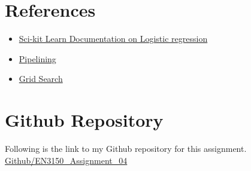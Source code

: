 \documentclass[11pt,a4paper]{article}
\begin{document}
\section{References}

\begin{itemize}
    \item \href{https://scikit-learn.org/stable/modules/generated/sklearn.linear_model.LinearRegression.html}{Sci-kit Learn Documentation on Logistic regression}
    \item \href{https://scikit-learn.org/stable/auto_examples/compose/plot_digits_pipe.html}{Pipelining}
    \item \href{https://scikit-learn.org/stable/modules/generated/sklearn.model_selection.GridSearchCV.html}{Grid Search}
   
\end{itemize}

\section{Github Repository}

Following is the link to my Github repository for this assignment.\\

\href{https://github.com/Vgr20/EN3150_Assignment_04.git}{Github/EN3150\_Assignment\_04}
\end{document}
